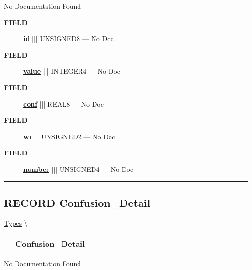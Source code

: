 \par





No Documentation Found







\par
\begin{description}
\item [\colorbox{tagtype}{\color{white} \textbf{\textsf{FIELD}}}] \textbf{\underline{id}} ||| UNSIGNED8 --- No Doc
\item [\colorbox{tagtype}{\color{white} \textbf{\textsf{FIELD}}}] \textbf{\underline{value}} ||| INTEGER4 --- No Doc
\item [\colorbox{tagtype}{\color{white} \textbf{\textsf{FIELD}}}] \textbf{\underline{conf}} ||| REAL8 --- No Doc
\item [\colorbox{tagtype}{\color{white} \textbf{\textsf{FIELD}}}] \textbf{\underline{wi}} ||| UNSIGNED2 --- No Doc
\item [\colorbox{tagtype}{\color{white} \textbf{\textsf{FIELD}}}] \textbf{\underline{number}} ||| UNSIGNED4 --- No Doc
\end{description}





\rule{\linewidth}{0.5pt}
\subsection*{\textsf{\colorbox{headtoc}{\color{white} RECORD}
Confusion\_Detail}}

\hypertarget{ecldoc:ml_core.types.confusion_detail}{}
\hspace{0pt} \hyperlink{ecldoc:ML_Core.Types}{Types} \textbackslash 

{\renewcommand{\arraystretch}{1.5}
\begin{tabularx}{\textwidth}{|>{\raggedright\arraybackslash}l|X|}
\hline
\hspace{0pt}\mytexttt{\color{red} } & \textbf{Confusion\_Detail} \\
\hline
\end{tabularx}
}

\par





No Documentation Found







